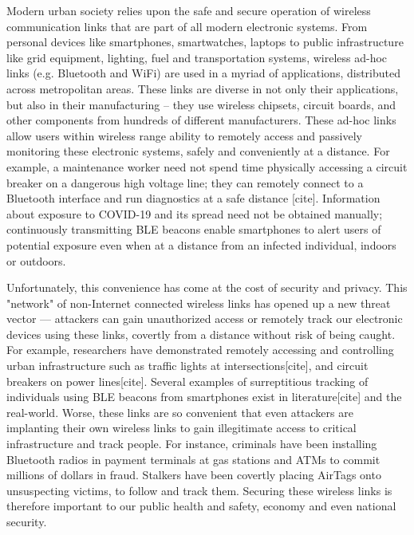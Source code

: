 Modern urban society relies upon the safe and secure operation of wireless communication links that are part of all modern electronic systems. 
%
From personal devices like smartphones, smartwatches, laptops to public infrastructure like grid equipment, lighting, fuel and transportation systems, wireless ad-hoc links (e.g. Bluetooth and WiFi) are used in a myriad of applications, distributed across metropolitan areas.
%
These links are diverse in not only their applications, but also in their manufacturing -- they use wireless chipsets, circuit boards, and other components from hundreds of different manufacturers.
%
These ad-hoc links allow users within wireless range ability to remotely access and passively monitoring these electronic systems, safely and conveniently at a distance.
%
For example, a maintenance worker need not spend time physically accessing a circuit breaker on a dangerous high voltage line; they can remotely connect to a Bluetooth interface and run diagnostics at a safe distance [cite].
%
Information about exposure to COVID-19 and its spread need not be obtained manually; continuously transmitting BLE beacons enable smartphones to alert users of potential exposure even when at a distance from an infected individual, indoors or outdoors.
%

Unfortunately, this convenience has come at the cost of security and privacy.
%
This "network" of non-Internet connected wireless links has opened up a new threat vector --- attackers can gain unauthorized access or remotely track our electronic devices using these links, covertly from a distance without risk of being caught.
%
For example, researchers have demonstrated remotely accessing and controlling urban infrastructure such as traffic lights at intersections[cite], and circuit breakers on power lines[cite].
%
Several examples of surreptitious tracking of individuals using BLE beacons from smartphones exist in literature[cite] and the real-world.
%
Worse, these links are so convenient that even attackers are implanting their own wireless links to gain illegitimate access to critical infrastructure and track people.
%
For instance, criminals have been installing Bluetooth radios in payment terminals at gas stations and ATMs to commit millions of dollars in fraud.
%
Stalkers have been covertly placing AirTags onto unsuspecting victims, to follow and track them.
%
Securing these wireless links is therefore important to our public health and safety, economy and even national security.

